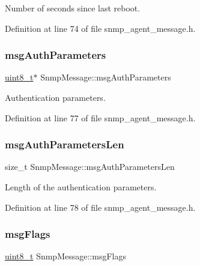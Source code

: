 Number of seconds since last reboot. 



Definition at line 74 of file snmp\+\_\+agent\+\_\+message.\+h.

\mbox{\label{structSnmpMessage_ac458dda88c1471dabbd9ec5ca3f0f0fc}} 
\subsubsection{\texorpdfstring{msg\+Auth\+Parameters}{msgAuthParameters}}
{\footnotesize\ttfamily \hyperlink{stdint_8h_aba7bc1797add20fe3efdf37ced1182c5}{uint8\+\_\+t}$\ast$ Snmp\+Message\+::msg\+Auth\+Parameters}



Authentication parameters. 



Definition at line 77 of file snmp\+\_\+agent\+\_\+message.\+h.

\mbox{\label{structSnmpMessage_a7b01dd73a305c550a38594c273feef27}} 
\subsubsection{\texorpdfstring{msg\+Auth\+Parameters\+Len}{msgAuthParametersLen}}
{\footnotesize\ttfamily size\+\_\+t Snmp\+Message\+::msg\+Auth\+Parameters\+Len}



Length of the authentication parameters. 



Definition at line 78 of file snmp\+\_\+agent\+\_\+message.\+h.

\mbox{\label{structSnmpMessage_a7cc5ff67bc58cd54bf3cf6f3d18879d4}} 
\subsubsection{\texorpdfstring{msg\+Flags}{msgFlags}}
{\footnotesize\ttfamily \hyperlink{stdint_8h_aba7bc1797add20fe3efdf37ced1182c5}{uint8\+\_\+t} Snmp\+Message\+::msg\+Flags}



